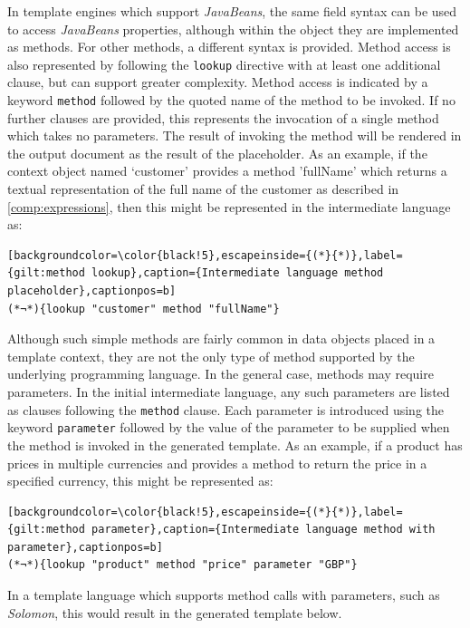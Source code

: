 In template engines which support \emph{JavaBeans}, the same field syntax can be used to access \emph{JavaBeans} properties, although within the object they are implemented as methods. For other methods, a different syntax is provided. Method access is also represented by following the \verb!lookup! directive with at least one additional clause, but can support greater complexity. Method access is indicated by a keyword \verb!method! followed by the quoted name of the method to be invoked. If no further clauses are provided, this represents the invocation of a single method which takes no parameters. The result of invoking the method will be rendered in the output document as the result of the placeholder. As an example, if the context object named `customer' provides a method 'fullName' which returns a textual representation of the full name of the customer as described in \autoref{comp:expressions}, then this might be represented in the intermediate language as:

\begin{lstlisting}[backgroundcolor=\color{black!5},escapeinside={(*}{*)},label={gilt:method lookup},caption={Intermediate language method placeholder},captionpos=b]
(*¬*){lookup "customer" method "fullName"}
\end{lstlisting}

Although such simple methods are fairly common in data objects placed in a template context, they are not the only type of method supported by the underlying programming language. In the general case, methods may require parameters. In the initial intermediate language, any such parameters are listed as clauses following the \verb!method! clause. Each parameter is introduced using the keyword \verb!parameter! followed by the value of the parameter to be supplied when the method is invoked in the generated template. As an example, if a product has prices in multiple currencies and provides a method to return the price in a specified currency, this might be represented as:

\begin{lstlisting}[backgroundcolor=\color{black!5},escapeinside={(*}{*)},label={gilt:method parameter},caption={Intermediate language method with parameter},captionpos=b]
(*¬*){lookup "product" method "price" parameter "GBP"}
\end{lstlisting}

In a template language which supports method calls with parameters, such as \emph{Solomon}, this would result in the generated template below.

